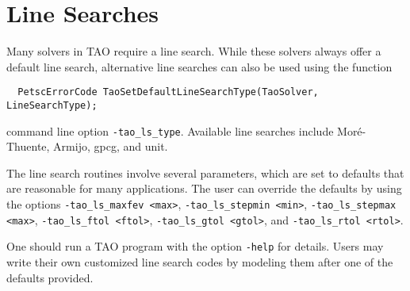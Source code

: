 \section{Line Searches} 
\label{sec:TaoLineSearch}

Many solvers in TAO require a line search.  While these solvers always
offer a default line search, alternative line searches can also be used
using the function
\begin{verbatim}
  PetscErrorCode TaoSetDefaultLineSearchType(TaoSolver, LineSearchType);
\end{verbatim}
command line option  {\tt -tao\_ls\_type}.  Available line searches 
include Mor\'{e}-Thuente\cite{more:92}, Armijo, gpcg, and unit.

The line search routines involve several parameters, which are set
to defaults that are reasonable for many applications.  The user
can override the defaults by using the options
{\tt -tao\_ls\_maxfev <max>},
{\tt -tao\_ls\_stepmin <min>},
{\tt -tao\_ls\_stepmax <max>},
{\tt -tao\_ls\_ftol <ftol>},
{\tt -tao\_ls\_gtol <gtol>}, and
{\tt -tao\_ls\_rtol <rtol>}.

One should run a TAO program with the option 
{\tt -help}
for details.  Users may write their own customized line search codes
by modeling them after one of the defaults provided.

